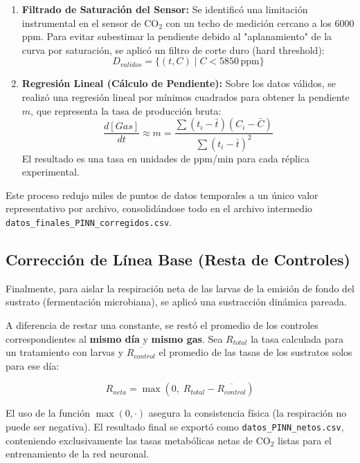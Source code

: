 \begin{enumerate}
    \item \textbf{Filtrado de Saturación del Sensor:} Se identificó una limitación instrumental en el sensor de CO$_2$ con un techo de medición cercano a los 6000 ppm. Para evitar subestimar la pendiente debido al "aplanamiento" de la curva por saturación, se aplicó un filtro de corte duro (hard threshold):
    \begin{equation}
        D_{validos} = \{ (t, C) \mid C < 5850 \, \text{ppm} \}
    \end{equation}
    
    \item \textbf{Regresión Lineal (Cálculo de Pendiente):} Sobre los datos válidos, se realizó una regresión lineal por mínimos cuadrados para obtener la pendiente $m$, que representa la tasa de producción bruta:
    \begin{equation}
        \frac{d[Gas]}{dt} \approx m = \frac{\sum (t_i - \bar{t})(C_i - \bar{C})}{\sum (t_i - \bar{t})^2}
    \end{equation}
    El resultado es una tasa en unidades de ppm/min para cada réplica experimental.
\end{enumerate}

Este proceso redujo miles de puntos de datos temporales a un único valor representativo por archivo, consolidándose todo en el archivo intermedio \texttt{datos\_finales\_PINN\_corregidos.csv}.

\subsection{Corrección de Línea Base (Resta de Controles)}
Finalmente, para aislar la respiración neta de las larvas de la emisión de fondo del sustrato (fermentación microbiana), se aplicó una sustracción dinámica pareada.

A diferencia de restar una constante, se restó el promedio de los controles correspondientes al \textbf{mismo día} y \textbf{mismo gas}. Sea $R_{total}$ la tasa calculada para un tratamiento con larvas y $\overline{R_{control}}$ el promedio de las tasas de los sustratos solos para ese día:

\begin{equation}
    R_{neta} = \max\left(0, \; R_{total} - \overline{R_{control}}\right)
\end{equation}

El uso de la función $\max(0, \cdot)$ asegura la consistencia física (la respiración no puede ser negativa). El resultado final se exportó como \texttt{datos\_PINN\_netos.csv}, conteniendo exclusivamente las tasas metabólicas netas de CO$_2$ listas para el entrenamiento de la red neuronal.
